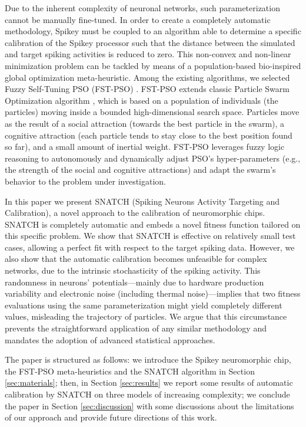 \documentclass[utf8]{frontiersFPHY} %
\newcommand {\name}{SNATCH}
\begin{document}
Due to the inherent complexity of neuronal networks, such parameterization cannot be manually fine-tuned. 
In order to create a completely automatic methodology, Spikey must be coupled to an algorithm able to determine a specific calibration of the Spikey processor such that the distance between the simulated and target spiking  activities is reduced to zero. 
This non-convex and non-linear minimization problem can be tackled by means of a population-based bio-inspired global optimization meta-heuristic.
Among the existing algorithms, we selected Fuzzy Self-Tuning PSO (FST-PSO) \cite{Nobile2018}.
FST-PSO extends classic Particle Swarm Optimization algorithm \cite{poli2007particle}, which is based on a population of individuals (the particles) moving inside a bounded high-dimensional search space.
Particles move as the result of a social attraction (towards the best particle in the swarm), a cognitive attraction (each particle tends to stay close to the best position found so far), and a small amount of inertial weight.
FST-PSO leverages fuzzy logic reasoning to autonomously and dynamically adjust PSO's hyper-parameters (e.g., the strength of the social and cognitive attractions) and adapt the swarm's  behavior to the problem under investigation.

In this paper we present \name{} (Spiking Neurons Activity Targeting and Calibration), a novel approach to the calibration of neuromorphic chips. 
\name{} is completely automatic and embeds a novel fitness function tailored on this specific problem.
We show that \name{} is effective on relatively small test cases, allowing a perfect fit with respect to the target spiking data.
However, we also show that the automatic calibration becomes unfeasible for  complex networks, due to the intrinsic stochasticity of the spiking activity.
This randomness in neurons' potentials---mainly due to hardware production variability and electronic noise (including thermal noise)---implies that two fitness evaluations using the same parameterization might yield completely different values, misleading the trajectory of particles.
We argue that this circumstance prevents the straightforward application of any similar methodology and mandates the adoption of advanced statistical approaches. 

The paper is structured as follows: we introduce the Spikey neuromorphic chip, the FST-PSO meta-heuristics and the SNATCH algorithm in Section \ref{sec:materials}; then, in Section \ref{sec:results} we report some results of automatic calibration by SNATCH on three models of increasing complexity; we conclude the paper in Section \ref{sec:discussion} with some discussions about the limitations of our approach and provide future directions of this work.
\end{document}

